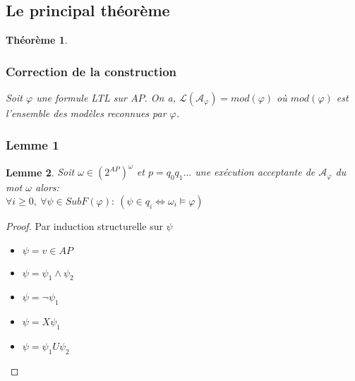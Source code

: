 \documentclass{beamer}
\theoremstyle{plain}
\newtheorem{thm}{Théorème}
\newtheorem{lem}[thm]{Lemme}
\theoremstyle{definition}
\begin{document}
\subsection{Le principal théorème}
\begin{frame}
  \begin{thm}
    \frametitle{Correction de la construction}
    
    Soit $\varphi$ une formule LTL sur $AP$. On a, $\mathcal{L}(\mathcal{A}_\varphi)=mod(\varphi)$ où $mod(\varphi)$ est l'ensemble des modèles reconnues par $\varphi$.
  \end{thm}
\end{frame}
\subsubsection{Lemme 1}
\begin{frame}
	\begin{lem}
		Soit $\omega \in (2^{AP})^\omega$ et $p=q_0q_1\dots$ une exécution acceptante de $\mathcal{A}_\varphi$ du mot $\omega$ alors: \\
		$\forall i \geq 0,\: \forall \psi \in SubF(\varphi): \: (\psi \in q_i \Leftrightarrow \omega_i \models \varphi)$
	\end{lem}
\end{frame}
\begin{frame}
	\begin{proof}
		Par induction structurelle sur $\psi$
		\pause
		\begin{itemize}
			\item $\psi = v \in AP$ \pause
			\item $\psi = \psi_1 \land \psi_2$ \pause
			\item $\psi = \lnot \psi_1$ \pause
			\item $\psi = X\psi_1$ \pause
			\item $\psi = \psi_1 U \psi_2$
		\end{itemize}
	\end{proof}
\end{frame}	
\end{document}

